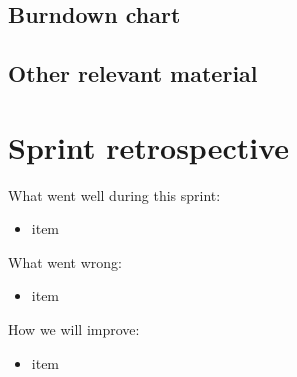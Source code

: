 \documentclass[a4paper,11pt]{article}
\begin{document}
\subsection{Burndown chart}



\subsection{Other relevant material}

\section{Sprint retrospective}

What went well during this sprint:

\begin{itemize}
	\item item
\end{itemize}

\noindent
What went wrong:

\begin{itemize}
	\item item
\end{itemize}

\noindent
How we will improve:
\begin{itemize}
	\item item
\end{itemize}
\end{document}
